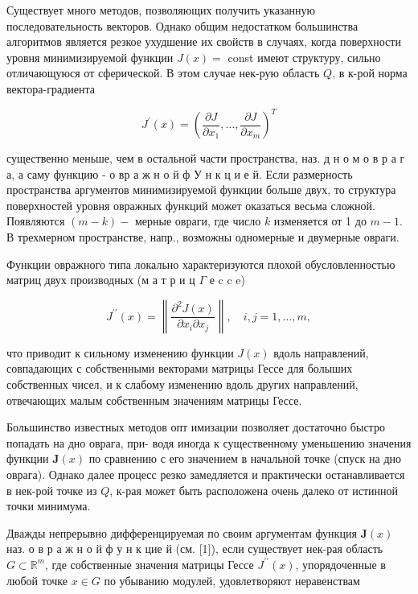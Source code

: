 \documentclass[10pt]{article}
\begin{document}
Существует много методов, позволяющих получить указанную последовательность векторов. Однако общим недостатком большинства алгоритмов является резкое ухудшение их свойств в случаях, когда поверхности уровня минимизируемой функции $J(x)=$ const имеют структуру, сильно отличающуюся от сферической. В этом случае нек-рую область $Q$, в к-рой норма вектора-градиента



\[

J^{\prime}(x)=\left(\frac{\partial J}{\partial x_{1}}, \ldots, \frac{\partial J}{\partial x_{m}}\right)^{T}

\]



существенно меньше, чем в остальной части пространства, наз. д н о м о в р а г а, а саму функцию - о вр а ж н о й ф У н к ц и е й. Если размерность пространства аргументов минимизируемой функции больше двух, то структура поверхностей уровня овражных функций может оказаться весьма сложной. Появляются $(m-k)-$ мерные овраги, где число $k$ изменяется от 1 до $m-1$. В трехмерном пространстве, напр., возможны одномерные и двумерные овраги.



Функции овражного типа локально характеризуются плохой обусловленностью матриц двух производных (м а т р и ц $\Gamma$ е c c e)



\[

J^{\prime \prime}(x)=\left\|\frac{\partial^{2} J(x)}{\partial x_{i} \partial x_{j}}\right\|, \quad i, j=1, \ldots, m,

\]



что приводит к сильному изменению функции $J(x)$ вдоль направлений, совпадающих с собственными векторами матрицы Гессе для болыших собственных чисел, и к слабому изменению вдоль других направлений, отвечающих малым собственным значениям матрицы Гессе.



Большинство известных методов опт имизации позволяет достаточно быстро попадать на дно оврага, при- водя иногда к существенному уменьшению значения функции $\boldsymbol{J}(x)$ по сравнению с его значением в начальной точке (спуск на дно оврага). Однако далее процесс резко замедляется и практически останавливается в нек-рой точке из $Q$, к-рая может быть расположена очень далеко от истинной точки минимума.



Дважды непрерывно дифференцируемая по своим аргументам функция $\boldsymbol{J}(x)$ наз. о в р а ж н о й ф у н к цие й (см. [1]), если существует нек-рая область $G \subset \mathbb{R}^{m}$, где собственные значения матрицы Гессе $J^{\prime \prime}(x)$, упорядоченные в любой точке $x \in G$ по убыванию модулей, удовлетворяют неравенствам
\end{document}
